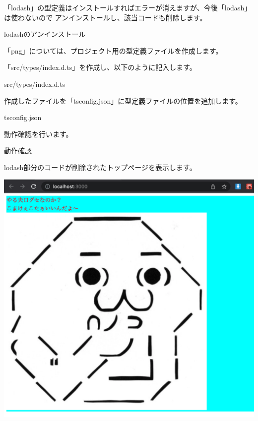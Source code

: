 \clearpage


「lodash」の型定義はインストールすればエラーが消えますが、今後「lodash」は使わないので
アンインストールし、該当コードも削除します。

\def\startercodeblockfontsize{}
\begin{starterterminal}[]{lodashのアンインストール}\end{starterterminal}

「png」については、プロジェクト用の型定義ファイルを作成します。

\vspace*{\baselineskip}

「src/types/index.d.ts」を作成し、以下のように記入します。

\def\startercodeblockfontsize{}
\begin{starterprogram}[]{src/types/index.d.ts}\end{starterprogram}

作成したファイルを「tsconfig.json」に型定義ファイルの位置を追加します。

\def\startercodeblockfontsize{}
\begin{starterprogram}[]{tsconfig.json}\end{starterprogram}

動作確認を行います。

\def\startercodeblockfontsize{}
\begin{starterterminal}[]{動作確認}\end{starterterminal}

lodash部分のコードが削除されたトップページを表示します。

\begin{reviewimage}%
\includegraphics[width=0.6\maxwidth]{./images/02-create-react-app/typescript03.png}%
\label{image:02-create-react-app:typescript03}
\end{reviewimage}

